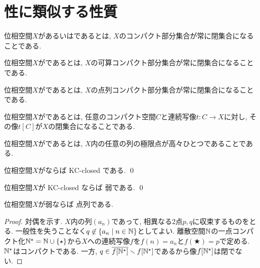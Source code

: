 \documentclass[uplatex, dvipdfmx, a4paper, 12pt, class=jsbook, crop=false]{standalone}
\begin{document}
\section{\Hausdorff 性に類似する性質}
\label{sec:Hausdorff-like-properties}

\begin{definition}
	位相空間$ X $があるいはであるとは, $ X $のコンパクト部分集合が常に閉集合になることである.
\end{definition}

\begin{definition}
	位相空間$ X $がであるとは, $ X $の可算コンパクト部分集合が常に閉集合になることである.
\end{definition}

\begin{definition}
	位相空間$ X $がであるとは, $ X $の点列コンパクト部分集合が常に閉集合になることである.
\end{definition}

\begin{definition}
	位相空間$ X $がであるとは, 任意のコンパクト\Hausdorff 空間$ C $と連続写像$ t \colon C \rightarrow X $に対し, その像$ t[C] $が$ X $の閉集合になることである.
\end{definition}

\begin{definition}
	位相空間$ X $がであるとは, $ X $内の任意の列の極限点が高々ひとつであることである.
\end{definition}

\begin{proposition}
	位相空間$X$が\Hausdorff ならば KC-closed である.
	\qed
\end{proposition}

\begin{proposition}
	位相空間$X$が KC-closed ならば 弱\Hausdorff である.
	\qed
\end{proposition}

\begin{proposition}
	位相空間$X$が弱\Hausdorff ならば 点列\Hausdorff である.
\end{proposition}

\begin{proof}
	対偶を示す.
	$X$内の列$(a_n)$であって, 相異なる2点$p, q$に収束するものをとる.
	一般性を失うことなく$q \not\in \setcomp{a_n}{n \in \N}$としてよい.
	離散空間$\mathbb{N}$の一点コンパクト化$\mathbb{N}^\star = \mathbb{N} \cup \{\star\}$から$X$への連続写像$f$を$f(n) = a_n$と$f(\bigstar) = p$で定める.
	$\mathbb{N}^\star$はコンパクト\Hausdorff である.
	一方, $q \in \overline{f[\mathbb{N}^\star]} \smallsetminus f[\mathbb{N}^\star]$であるから像$f[\mathbb{N}^\star]$は閉でない.
\end{proof}
\end{document}
